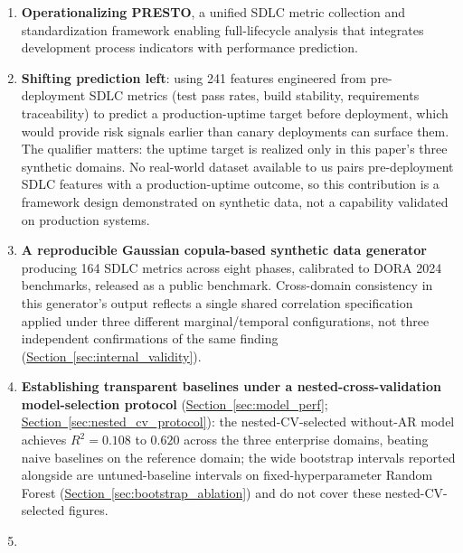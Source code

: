 \documentclass[technologies,article,submit,pdftex,moreauthors]{Definitions/mdpi}
\begin{document}
\begin{enumerate}
\def\labelenumi{\arabic{enumi}.}
\item
  \textbf{Operationalizing PRESTO}, a unified SDLC metric collection and standardization framework enabling full-lifecycle analysis that integrates development process indicators with performance prediction.
\item
  \textbf{Shifting prediction left}: using 241 features engineered from pre-deployment SDLC metrics (test pass rates, build stability, requirements traceability) to predict a production-uptime target before deployment, which would provide risk signals earlier than canary deployments can surface them. The qualifier matters: the uptime target is realized only in this paper's three synthetic domains. No real-world dataset available to us pairs pre-deployment SDLC features with a production-uptime outcome, so this contribution is a framework design demonstrated on synthetic data, not a capability validated on production systems.
\item
  \textbf{A reproducible Gaussian copula-based synthetic data generator} producing 164 SDLC metrics across eight phases, calibrated to DORA 2024 benchmarks, released as a public benchmark. Cross-domain consistency in this generator's output reflects a single shared correlation specification applied under three different marginal/temporal configurations, not three independent confirmations of the same finding (\hyperref[sec:internal_validity]{Section~\ref*{sec:internal_validity}}).
\item
  \textbf{Establishing transparent baselines under a nested-cross-validation model-selection protocol} (\hyperref[sec:model_perf]{Section~\ref*{sec:model_perf}}; \hyperref[sec:nested_cv_protocol]{Section~\ref*{sec:nested_cv_protocol}}): the nested-CV-selected without-AR model achieves \(R^2 = 0.108\) to \(0.620\) across the three enterprise domains, beating naive baselines on the reference domain; the wide bootstrap intervals reported alongside are untuned-baseline intervals on fixed-hyperparameter Random Forest (\hyperref[sec:bootstrap_ablation]{Section~\ref*{sec:bootstrap_ablation}}) and do not cover these nested-CV-selected figures.
\item

\end{enumerate}
\end{document}
